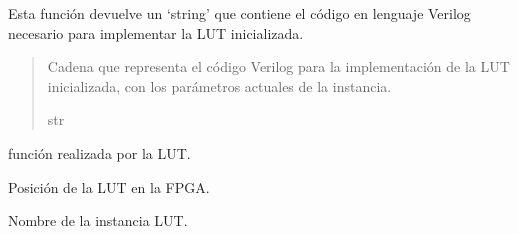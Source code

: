 \documentclass[letterpaper,10pt,english]{sphinxmanual}
\begin{document}
\begin{fulllineitems}

\begin{fulllineitems}
\label{\detokenize{fpga:fpga.Lut6.impl}}
\pysigstartsignatures
{}
\pysigstopsignatures
\sphinxAtStartPar
Esta función devuelve un ‘string’ que contiene el código en lenguaje Verilog necesario para implementar la LUT inicializada.
\begin{quote}\begin{description}
\sphinxAtStartPar
Cadena que representa el código Verilog para la implementación de la LUT inicializada, con los parámetros actuales de la instancia.

\sphinxAtStartPar
str

\end{description}\end{quote}

\end{fulllineitems}


\begin{fulllineitems}
\label{\detokenize{fpga:fpga.Lut6.init}}
\pysigstartsignatures
{}
\pysigstopsignatures
\sphinxAtStartPar
función realizada por la LUT.

\end{fulllineitems}


\begin{fulllineitems}
\label{\detokenize{fpga:fpga.Lut6.loc}}
\pysigstartsignatures
{}
\pysigstopsignatures
\sphinxAtStartPar
Posición de la LUT en la FPGA.

\end{fulllineitems}


\begin{fulllineitems}
\label{\detokenize{fpga:fpga.Lut6.name}}
\pysigstartsignatures
{}
\pysigstopsignatures
\sphinxAtStartPar
Nombre de la instancia LUT.


\end{fulllineitems}
\end{fulllineitems}
\end{document}
